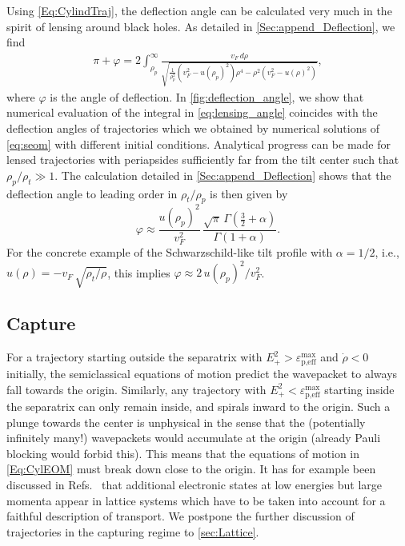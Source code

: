 \documentclass[submission, Phys]{SciPost}
\begin{document}
Using \cref{Eq:CylindTraj}, the deflection angle can be calculated very much in the spirit of lensing around black holes\cite{Weinberg}. As detailed in \cref{Sec:append_Deflection}, we find
\begin{align}
    \pi+\varphi =
    2\int_{\rho_p}^\infty\frac{v_F\, d\rho}{\sqrt{\frac{1}{\rho_p^2}(v_F^2-u(\rho_p)^2)\rho^4-\rho^2(v_F^2-u(\rho)^2)}},
    \label{eq:lensing_angle}
\end{align}
where $\varphi$ is the angle of deflection.
In \cref{fig:deflection_angle}, we show that numerical evaluation of the integral in \cref{eq:lensing_angle} coincides with the deflection angles of trajectories which we obtained by numerical solutions of \cref{eq:seom} with different initial conditions.
Analytical progress can be made for lensed trajectories with periapsides sufficiently far from the tilt center such that $\rho_p/\rho_t\gg1$. The calculation detailed in \cref{Sec:append_Deflection} shows that the deflection angle  to leading order in $\rho_t/\rho_p$ is then given by
\begin{equation}
    \varphi \approx \frac{u(\rho_p)^2}{v_F^2}\,\frac{\sqrt{\pi}\,\Gamma\left(\frac{3}{2}+\alpha\right)}{\Gamma\left(1+\alpha\right)}.
    \label{eq:deflection_angle_approx}
\end{equation}
For the concrete example of the Schwarzschild-like tilt profile with $\alpha=1/2$, i.e., $u(\rho)=-v_F\,\sqrt{\rho_t/\rho}$, this implies $\varphi\approx 2\,u(\rho_p)^2/v_F^2$.

\subsection{Capture}
For a trajectory starting outside the separatrix with $E_+^2> {\varepsilon}_{\text{p,eff}}^{\text{max}}$ and $\dot{\rho}<0$ initially, the semiclassical equations of motion predict the wavepacket to always fall towards the origin. Similarly, any trajectory with $E_+^2 < {\varepsilon}_{\text{p,eff}}^{\text{max}}$ starting inside the separatrix can only remain inside, and spirals inward to the origin. Such a plunge towards the center is unphysical in the sense that the (potentially infinitely many!) wavepackets would accumulate at the origin (already Pauli blocking would forbid this). This means that the equations of motion in \cref{Eq:CylEOM} must break down close to the origin. It has for example been discussed in Refs.~\cite{De_Beule_2021,Sabsovich_2022} that additional electronic states at low energies but large momenta appear in lattice systems which have to be taken into account for a faithful description of transport. We postpone the further discussion of trajectories in the capturing regime to \cref{sec:Lattice}.
\end{document}
